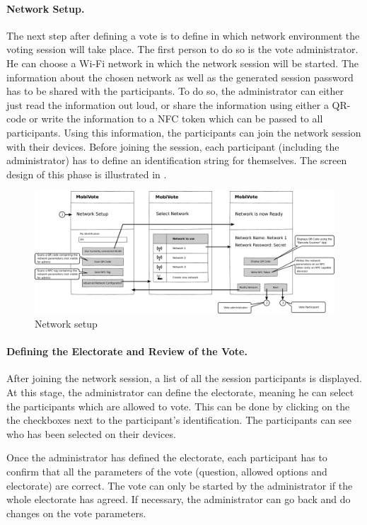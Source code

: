 \documentclass[numbers=noenddot, abstract=on, a4paper, headsepline,
footsepline, oneside, draft=off]{scrreprt}
\begin{document}
\paragraph{Network Setup.}
The next step after defining a vote is to define in which network environment
the voting session will take place. The first person to do so is the vote
administrator. He can choose a Wi-Fi network in which the network session will
be started. The information about the chosen network as well as the generated
session password has to be shared with the participants. To do so, the
administrator can either just read the information out loud, or share the
information using either a QR-code or write the information to a NFC token which
can be passed to all participants. Using this information, the participants can
join the network session with their devices. Before joining the session, each
participant (including the administrator) has to define an identification string
for themselves. The screen design of this phase is illustrated in
.

\begin{figure}[htb]
	\centering
	\includegraphics[height=.3\textheight]{img/storyboard/network_setup}
	\caption{Network setup}
	\label{fig:network_setup}
\end{figure}


\paragraph{Defining the Electorate and Review of the Vote.}
After joining the network session, a list of all the session participants is
displayed. At this stage, the administrator can define the electorate, meaning
he can select the participants which are allowed to vote. This can be done by
clicking on the the checkboxes next to the participant's identification. The
participants can see who has been selected on their devices.

Once the administrator has defined the electorate, each participant has to
confirm that all the parameters of the vote (question, allowed options
and electorate) are correct. The vote can only be started by the administrator
if the whole electorate has agreed. If necessary, the administrator can go back and do changes on the vote parameters.
\end{document}
